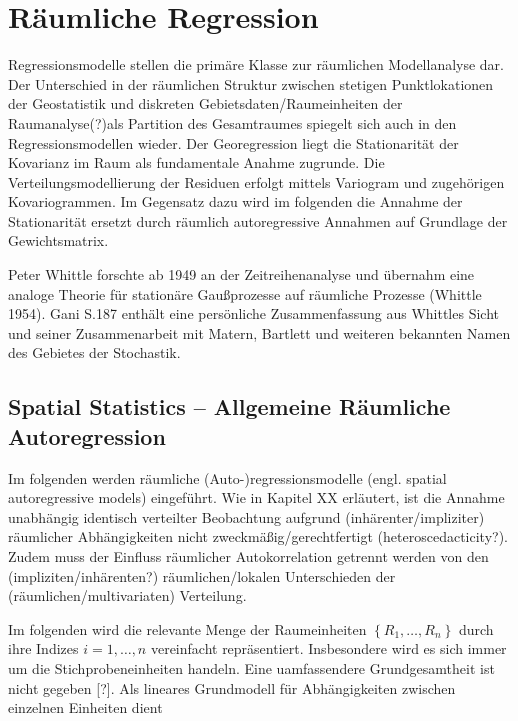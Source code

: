 \chapter{Räumliche Regression}

Regressionsmodelle stellen die primäre Klasse zur räumlichen Modellanalyse dar. 
Der Unterschied in der räumlichen Struktur zwischen stetigen Punktlokationen der Geostatistik und 
diskreten Gebietsdaten/Raumeinheiten der Raumanalyse(?)als Partition des Gesamtraumes spiegelt sich auch in den Regressionsmodellen wieder. 
Der Georegression liegt die Stationarität der Kovarianz im Raum als fundamentale Anahme zugrunde. 
Die Verteilungsmodellierung der Residuen erfolgt mittels Variogram und zugehörigen Kovariogrammen.
Im Gegensatz dazu wird im folgenden die Annahme der Stationarität ersetzt durch 
räumlich autoregressive Annahmen auf Grundlage der Gewichtsmatrix. 

Peter Whittle forschte ab 1949 an der Zeitreihenanalyse und übernahm eine analoge 
Theorie für stationäre Gaußprozesse auf räumliche Prozesse (Whittle 1954). Gani S.187 enthält eine 
persönliche Zusammenfassung aus Whittles Sicht und seiner Zusammenarbeit mit Matern, Bartlett und weiteren bekannten
Namen des Gebietes der Stochastik. 

\section{Spatial Statistics – Allgemeine Räumliche Autoregression}

Im folgenden werden räumliche (Auto-)regressionsmodelle (engl. spatial autoregressive models) eingeführt. 
Wie in Kapitel XX erläutert, ist die Annahme unabhängig identisch verteilter Beobachtung aufgrund 
(inhärenter/impliziter) räumlicher Abhängigkeiten nicht zweckmäßig/gerechtfertigt (heteroscedacticity?). 
Zudem muss der Einfluss räumlicher Autokorrelation getrennt werden von den (impliziten/inhärenten?) 
räumlichen/lokalen Unterschieden der (räumlichen/multivariaten) Verteilung.

Im folgenden wird die relevante Menge der Raumeinheiten $\left\{ R_1,\ldots,R_n \right\}$ durch ihre 
Indizes $i=1,\ldots,n$ vereinfacht repräsentiert. Insbesondere wird es sich immer um 
die Stichprobeneinheiten handeln. Eine uamfassendere Grundgesamtheit ist nicht gegeben [?].
Als lineares Grundmodell für Abhängigkeiten zwischen einzelnen Einheiten dient

